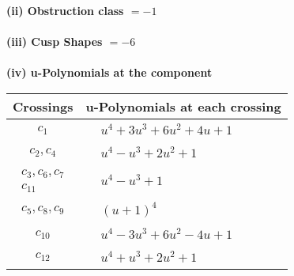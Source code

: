 \documentclass[1p]{elsarticle_modified}
\theoremstyle{definition}
\begin{document}
\flushleft \textbf{(ii) Obstruction class $= -1$}\\~\\
\flushleft \textbf{(iii) Cusp Shapes $= -6$}\\~\\
\newpage\renewcommand{\arraystretch}{1}
\flushleft \textbf{(iv) u-Polynomials at the component}\newline \\
\begin{tabular}{m{50pt}|m{274pt}}
Crossings & \hspace{64pt}u-Polynomials at each crossing \\
\hline $$\begin{aligned}c_{1}\end{aligned}$$&$\begin{aligned}
&u^4+3 u^3+6 u^2+4 u+1
\end{aligned}$\\
\hline $$\begin{aligned}c_{2},c_{4}\end{aligned}$$&$\begin{aligned}
&u^4- u^3+2 u^2+1
\end{aligned}$\\
\hline $$\begin{aligned}c_{3},c_{6},c_{7}\\c_{11}\end{aligned}$$&$\begin{aligned}
&u^4- u^3+1
\end{aligned}$\\
\hline $$\begin{aligned}c_{5},c_{8},c_{9}\end{aligned}$$&$\begin{aligned}
&(u+1)^4
\end{aligned}$\\
\hline $$\begin{aligned}c_{10}\end{aligned}$$&$\begin{aligned}
&u^4-3 u^3+6 u^2-4 u+1
\end{aligned}$\\
\hline $$\begin{aligned}c_{12}\end{aligned}$$&$\begin{aligned}
&u^4+u^3+2 u^2+1
\end{aligned}$\\
\hline
\end{tabular}\\~\\
\end{document}
